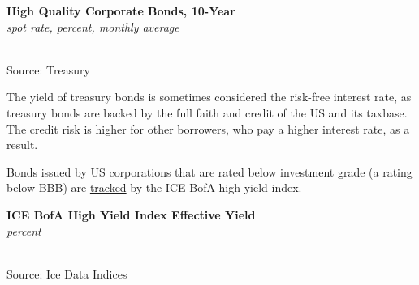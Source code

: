 \documentclass{report}
\makeatletter
\newcommand{\tbllink}[1]{\href{https://raw.githubusercontent.com/bdecon/US-chartbook/master/chartbook/data/#1}{\faTable}}
\newcommand*\short[1]{\expandafter\@gobbletwo\number\numexpr#1\relax}
\newcommand{\dateaxisticks}{
		date coordinates in=x, axis line style={draw=none},
		xmax={2022-03-15},
		max space between ticks=40,	    
		xtick={{1990-01-01}, {1992-01-01}, {1994-01-01}, 
			{1996-01-01}, {1998-01-01}, {2000-01-01}, 
			{2002-01-01}, {2004-01-01}, {2006-01-01},
			{2008-01-01}, {2010-01-01}, {2012-01-01}, {2014-01-01},
		    {2016-01-01}, {2018-01-01}, {2020-01-01}, {2022-01-01}, 
		    {2024-01-01}, {2026-01-01}},
		minor xtick={{1989-01-01}, {1991-01-01}, {1993-01-01},
			{1995-01-01}, {1997-01-01}, {1999-01-01}, 
			{2001-01-01}, {2003-01-01}, {2005-01-01}, {2007-01-01},
		    {2009-01-01}, {2011-01-01}, {2013-01-01}, {2015-01-01},
		    {2017-01-01}, {2019-01-01}, {2021-01-01}, {2023-01-01}, 
		    {2025-01-01}, {2027-01-01}},
		enlarge y limits={0.06}, enlarge x limits={0.01},
		}
\newcommand{\bbar}[2]{extra #1 ticks = {{#2}}, extra #1 tick labels = ,
		extra #1 tick style = {grid=major, grid style={thick, black!25}},}
\newcommand{\stdline}[4]{\addplot[very thick, no markers, color=#1] 
		table [x=#2, y=#3, col sep=comma] {#4};	}
\newcommand{\rbars}{
		\fill[color=black!10] (axis cs:{1990-07-01},\pgfkeysvalueof{/pgfplots/ymin}) rectangle 
			(axis cs:{1991-03-01}, \pgfkeysvalueof{/pgfplots/ymax});
		\fill[color=black!10] (axis cs:{2007-12-01},\pgfkeysvalueof{/pgfplots/ymin}) rectangle 
			(axis cs:{2009-07-01}, \pgfkeysvalueof{/pgfplots/ymax});
		\fill[color=black!10] (axis cs:{2001-03-01},\pgfkeysvalueof{/pgfplots/ymin}) rectangle 
			(axis cs:{2001-11-01}, \pgfkeysvalueof{/pgfplots/ymax});
		\fill[color=black!10] (axis cs:{2020-02-01},\pgfkeysvalueof{/pgfplots/ymin}) rectangle 
			(axis cs:{2020-05-01}, \pgfkeysvalueof{/pgfplots/ymax});}
\newcommand{\rebars}{
		\fill[color=black!10] (axis cs:{2007-12-01},\pgfkeysvalueof{/pgfplots/ymin}) rectangle 
			(axis cs:{2009-07-01}, \pgfkeysvalueof{/pgfplots/ymax});
		\fill[color=black!10] (axis cs:{2001-03-01},\pgfkeysvalueof{/pgfplots/ymin}) rectangle 
			(axis cs:{2001-11-01}, \pgfkeysvalueof{/pgfplots/ymax});
		\fill[color=black!10] (axis cs:{2020-02-01},\pgfkeysvalueof{/pgfplots/ymin}) rectangle 
			(axis cs:{2020-05-01}, \pgfkeysvalueof{/pgfplots/ymax});}
\makeatother
\begin{document}
{{\begin{minipage}{0.76\textwidth}
\normalsize \textbf{High Quality Corporate Bonds, 10-Year}\\
\footnotesize{\textit{spot rate, percent, monthly average}}\\
\hspace*{-2mm} \\
\footnotesize{Source: Treasury} \hfill \tbllink{hqcb.csv}
\vspace{6mm} 

\small The yield of treasury bonds is sometimes considered the risk-free interest rate, as treasury bonds are backed by the full faith and credit of the US and its taxbase. The credit risk is higher for other borrowers, who pay a higher interest rate, as a result. 

Bonds issued by US corporations that are rated below investment grade (a rating below BBB) are \href{https://fred.stlouisfed.org/series/BAMLH0A0HYM2EY}{tracked} by the ICE BofA high yield index. 
\vspace{1mm}

\normalsize \textbf{ICE BofA High Yield Index Effective Yield}\\
\footnotesize{\textit{percent}}\\
\hspace*{-2mm} \\
\footnotesize{Source: Ice Data Indices} \hfill \tbllink{highyield.csv}
\end{minipage}
\newpage
\hypertarget{capmm}{}
\begin{minipage}{0.76\textwidth}

\end{minipage}}}
\end{document}
